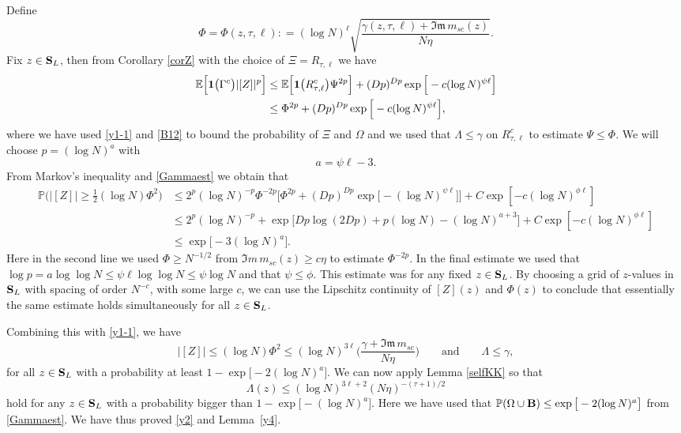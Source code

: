 \documentclass[draft]{article}
\newcommand{\non}{\nonumber}
\renewcommand{\Im}{\mathfrak Im}
\newcommand{\be}{\begin{equation}}
\newcommand{\ee}{\end{equation}}
\newcommand{\barZ}{ {[ Z ]}}
\newcommand{\im}{{\mathfrak{Im} \, }}
\newcommand{\E}{{\mathbb E }}
\renewcommand{\P}{{\mathbb P}}
\newcommand{\bS}{ {\bf  S}}
\newcommand{\qed}{\hfill\fbox{}\par\vspace{0.3mm}}
\newenvironment{proof}{{\bf Proof.}} {\hfill\qed}
\numberwithin{equation}{section}
\numberwithin{theorem}{section}
\numberwithin{definition}{section}
\numberwithin{remark}{section}
\begin{document}
\begin{proof} 
 Define 
\be \label{1.9x}
\Phi = \Phi(z,\tau, \ell) : = (\log N)^\ell  \sqrt{\frac{\gamma(z,\tau,\ell)
+\im m_{sc}(z) }{N\eta}}.
\ee
Fix $z\in \bS_L$, then 
from  Corollary \ref{corZ} with the choice of $\Xi = R_{\tau,\ell}$ we have 
\begin{align}
\E \Big[ {\bf 1}\big( \Gamma^c\big)|\barZ|^p\Big]  & \le
 \E \Big[ {\bf 1}\big( R_{\tau,\ell}^c \big) \Psi^{2p}\Big] + 
  (Dp)^{Dp}    \exp \Big [  - c(\log N) ^{ \psi \ell } \Big ] \\ 
 &\le\Phi^{2p} +   (Dp)^{Dp}  \exp \Big [  - c(\log N) ^{ \psi \ell }   \Big ], 
\end{align}
where we have used \eqref{y1-1} and \eqref{B12} to bound the probability of $\Xi$ and $\Omega$
and we used that $\Lambda\le \gamma$ on $R_{\tau,\ell}^c$ to estimate $\Psi\le \Phi$.
 We will choose $p = (\log N)^a$ with 
\be
a = \psi \ell  - 3.
\ee
{F}rom Markov's inequality and \eqref{Gammaest} we obtain that
\begin{align}
\P  \Big (  |[Z]| \ge  \frac{1}{2}(\log N )  \Phi^2 \Big ) 
& \le 2^p( \log N)^{-  p }  \Phi^{-2p}  \Big [  \Phi^{2p} +  
  (Dp)^{Dp}    \exp \big [  - (\log N) ^{ \psi \ell } \big]\Big ]    
 + C\exp [- c(\log N)^{\phi\ell}]
\non\\
\label{2.12}
& \le  2^p( \log N)^{-   p }  +       \exp 
\big[ Dp\log (2Dp)+ p(\log N) -  (\log N)^{a+3}  \big ]  + C\exp [- c(\log N)^{\phi\ell}]    
\non\\
& \le
\exp \Big [  -   3(\log N)^{a}  \Big ].
\end{align}
Here in the second line we used $\Phi\ge N^{-1/2}$ from $\Im\, m_{sc}(z)\ge c\eta$
to estimate $\Phi^{-2p}$. In the final estimate we used that
$\log p = a\log \log N\le \psi\ell \log\log N\le \psi\log N$
and that $\psi\le \phi$.
This estimate was for any fixed $z\in\bS_L$.
By choosing a grid of $z$-values in
 $\bS_L$ with spacing of order $N^{-c}$, 
with some large $c$, we can use
the Lipschitz  continuity of $[Z](z)$ and $\Phi(z)$
to conclude that essentially the same estimate holds
simultaneously for all $z\in \bS_L$.

Combining this with \eqref{y1-1}, we have
\be\label{x2} 
 |[Z]|\le  (\log N )   \Phi^2  \le  (\log N )^{ 3 \ell } 
\Big (  \frac{\gamma +\im m_{sc} }{N\eta}\Big ) \qquad \mbox{and} \qquad \Lambda\le \gamma,
\ee
for all $z\in \bS_L$ with a probability at least $1- \exp \big [  -   2(\log N)^{a}  \big ]$.
We can now apply Lemma \ref{selfKK} so that 
\be\label{spo21}
\Lambda(z)\leq (\log N)^{3 \ell + 2}(N\eta)^{-(\tau+ 1)/2}
\ee
hold  for any $z\in {\bf S}_L $
with  a probability 
bigger than  $1- \exp \big [  -   (\log N)^{a}  \big ]$.  
Here we have used that  
 $\P (\Omega \cup {\bf B}) \le \exp \big [  -   2(\log N)^{a}  \big ]$
 from  \eqref{Gammaest}. 
  We have thus proved \eqref{y2} and Lemma~\ref{y4}.
\end{proof} 
\end{document}
